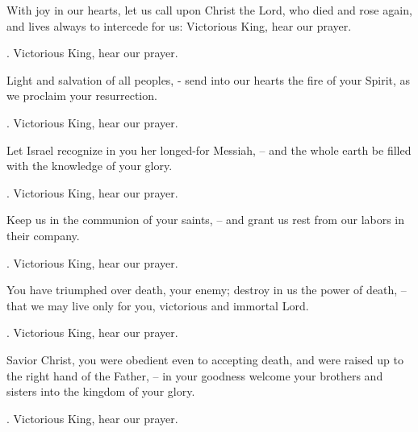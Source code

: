 \lettrine[loversize=0.15,lines=2]{W}{}ith joy in our hearts, let us call upon Christ the Lord, who died and rose again, and lives always to intercede for us: Victorious King, hear our prayer.
\par \Rbar. Victorious King, hear our prayer.

Light and salvation of all peoples, - send into our hearts the fire of your Spirit, as we proclaim your resurrection.
\par \Rbar. Victorious King, hear our prayer.

Let Israel recognize in you her longed-for Messiah,
– and the whole earth be filled with the knowledge of your glory.
\par \Rbar. Victorious King, hear our prayer.

Keep us in the communion of your saints,
– and grant us rest from our labors in their company.
\par \Rbar. Victorious King, hear our prayer.

You have triumphed over death, your enemy; destroy in us the power of death,
– that we may live only for you, victorious and immortal Lord.
\par \Rbar. Victorious King, hear our prayer.

Savior Christ, you were obedient even to accepting death, and were raised up to the right hand of the Father,
– in your goodness welcome your brothers and sisters into the kingdom of your glory.
\par \Rbar. Victorious King, hear our prayer.